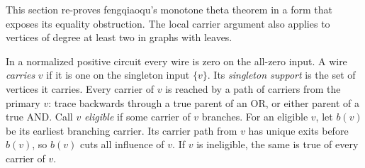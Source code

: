 \documentclass[11pt]{article}
\theoremstyle{definition}
\theoremstyle{remark}
\begin{document}
This section re-proves fengqiaoqu's monotone theta theorem\cite{mono} in
a form that exposes its equality obstruction. The local carrier argument
also applies to vertices of degree at least two in graphs with leaves.

In a normalized positive circuit every wire is zero on the all-zero input.
A wire \emph{carries} $v$ if it is one on the singleton input $\{v\}$.
Its \emph{singleton support} is the set of vertices it carries.
Every carrier of $v$ is reached by a path of carriers from the primary $v$:
trace backwards through a true parent of an OR, or either parent of a true
AND. Call $v$ \emph{eligible} if some carrier of $v$ branches. For an
eligible $v$, let $b(v)$ be its earliest branching carrier. Its carrier path
from $v$ has unique exits before $b(v)$, so $b(v)$ cuts all influence of $v$.
If $v$ is ineligible, the same is true of every carrier of $v$.
\end{document}
